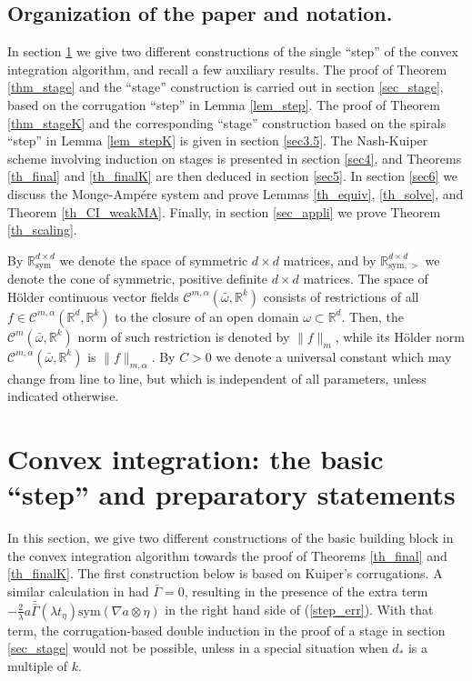 \documentclass[reqno,twoside,11pt]{amsart}
\newcommand{\sym}{\mathrm{sym}}
\newcommand{\R}{\mathbb{R}}
\newcommand*{\dbar}[1]{\bar{\bar{#1}}}
\numberwithin{equation}{section}
\theoremstyle{plain}
\theoremstyle{definition}
\begin{document}
\subsection{Organization of the paper and notation.} 
In section \ref{sec_step} we give two different constructions of the single ``step'' of the
convex integration algorithm, and recall a few auxiliary
results. The proof of Theorem \ref{thm_stage} and the ``stage''
construction is carried out in section \ref{sec_stage}, based on the
corrugation ``step'' in Lemma \ref{lem_step}. The proof 
of Theorem \ref{thm_stageK} and the corresponding ``stage''
construction based on the spirals ``step'' in Lemma \ref{lem_stepK}
is given in section \ref{sec3.5}.
The Nash-Kuiper scheme involving induction
on stages is presented in section \ref{sec4}, and Theorems
\ref{th_final} and \ref{th_finalK} are then deduced in section \ref{sec5}.
In section \ref{sec6} we discuss the Monge-Amp\'ere system and
prove Lemmas \ref{th_equiv}, \ref{th_solve}, and Theorem \ref{th_CI_weakMA}. Finally, in section
\ref{sec_appli} we prove Theorem \ref{th_scaling}.

\medskip

\noindent By $\mathbb{R}^{d\times d}_{\sym}$ we denote the space of symmetric
$d\times d$ matrices, and by  $\mathbb{R}^{d\times d}_{\sym, >}$ we
denote the cone of symmetric, positive definite $d\times d$ matrices.
The space of H\"older continuous vector fields
$\mathcal{C}^{m,\alpha}(\bar\omega,\R^k)$ consists of restrictions of
all $f\in \mathcal{C}^{m,\alpha}(\mathbb{R}^d,\R^k)$ to the closure of an open domain
$\omega\subset\R^d$. Then, the $\mathcal{C}^m(\bar\omega,\R^k)$ norm of such restriction is
denoted by $\|f\|_m$, while its H\"older norm $\mathcal{C}^{m,
  \alpha}(\bar\omega,\R^k)$ is $\|f\|_{m,\alpha}$. 
By $C>0$ we denote a universal constant which may change from line to
line, but which is independent of all parameters, unless indicated otherwise.

\section{Convex integration: the basic ``step'' and preparatory statements}\label{sec_step}

In this section, we give two different constructions of the basic building block in
the convex integration algorithm towards the proof of Theorems
\ref{th_final} and \ref{th_finalK}. The first construction below is based on
Kuiper's corrugations. A similar calculation in \cite{lewpak_MA}
had $\bar\Gamma=0$, resulting in the presence of the extra term
$-\frac{2}{\lambda} a \dbar\Gamma(\lambda t_\eta)\sym(\nabla a \otimes
\eta)$ in the right hand side of (\ref{step_err}). With that term,
the corrugation-based double induction in the proof of a stage in
section \ref{sec_stage}
would not be possible,
unless in a special situation when $d_*$ is a multiple of $k$.
\end{document}
